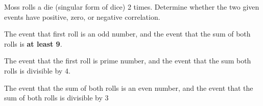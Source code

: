 \documentclass[a4paper, 10pt]{article}
\begin{document}
\begin{problem}
	Moss rolls a die (singular form of dice) 2 times. Determine whether the two given events have positive, zero, or negative correlation.
	\begin{subproblems_alpha}
		\item The event that first roll is an odd number, and the event that the sum of both rolls is \textbf{at least 9}.
		\item The event that the first roll is prime number, and the event that the sum both rolls is divisible by 4.
		\item The event that the sum of both rolls is an even number, and the event that the sum of both rolls is divisible by 3
	\end{subproblems_alpha}
\end{problem}
\end{document}
